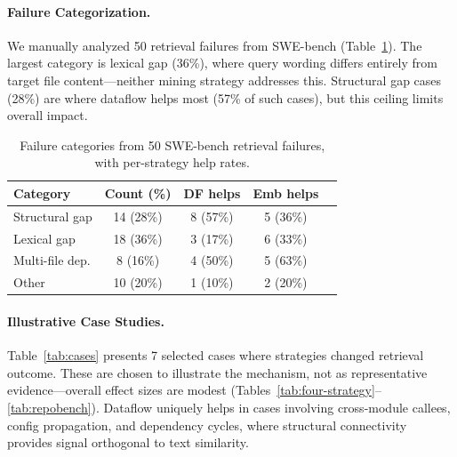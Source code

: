 \documentclass[11pt]{article}
\begin{document}
\paragraph{Failure Categorization.}
We manually analyzed 50 retrieval failures from SWE-bench (Table~\ref{tab:failure}).
The largest category is lexical gap (36\%), where query wording differs entirely from target file content---neither mining strategy addresses this.
Structural gap cases (28\%) are where dataflow helps most (57\% of such cases), but this ceiling limits overall impact.

\begin{table}[t]
\centering
\caption{Failure categories from 50 SWE-bench retrieval failures, with per-strategy help rates.}
\label{tab:failure}
\begin{tabular}{lcccc}
\toprule
Category & Count (\%) & DF helps & Emb helps \\
\midrule
Structural gap      & 14 (28\%) & 8 (57\%) & 5 (36\%) \\
Lexical gap         & 18 (36\%) & 3 (17\%) & 6 (33\%) \\
Multi-file dep.     &  8 (16\%) & 4 (50\%) & 5 (63\%) \\
Other               & 10 (20\%) & 1 (10\%) & 2 (20\%) \\
\bottomrule
\end{tabular}
\end{table}

\paragraph{Illustrative Case Studies.}
Table~\ref{tab:cases} presents 7 selected cases where strategies changed retrieval outcome.
These are chosen to illustrate the mechanism, not as representative evidence---overall effect sizes are modest (Tables~\ref{tab:four-strategy}--\ref{tab:repobench}).
Dataflow uniquely helps in cases involving cross-module callees, config propagation, and dependency cycles, where structural connectivity provides signal orthogonal to text similarity.
\end{document}
